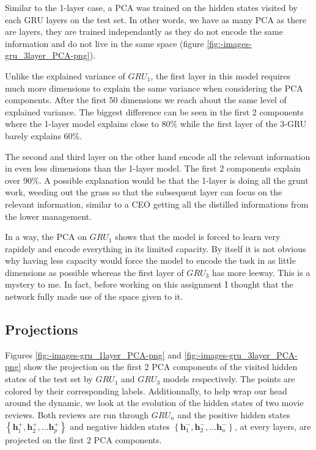 \documentclass{article}
\begin{document}
Similar to the 1-layer case, a PCA was trained on the hidden states visited by each GRU layers on the test set. In other words, we have as many PCA as there are layers, they are trained independantly as they do not encode the same information and do not live in the same space (figure \ref{fig:-images-gru_3layer_PCA-png}).

Unlike the explained variance of $GRU_1$, the first layer in this model requires much more dimensions to explain the same variance when considering the PCA components. After the first 50 dimensions we reach about the same level of explained variance. The biggest difference can be seen in the first 2 components where the 1-layer model explains close to 80\% while the first layer of the 3-GRU barely explains 60\%. 

The second and third layer on the other hand encode all the relevant information in even less dimensions than the 1-layer model. The first 2 components explain over 90\%. A possible explanation would be that the 1-layer is doing all the grunt work, weeding out the grass so that the subsequent layer can focus on the relevant information, similar to a CEO getting all the distilled informations from the lower management. 

In a way, the PCA on $GRU_1$ shows that the model is forced to learn very rapidely and encode everything in its limited capacity. By itself it is not obvious why having less capacity would force the model to encode the task in as little dimensions as possible whereas the first layer of $GRU_3$ has more leeway. This is a mystery to me. In fact, before working on this assignment I thought that the network fully made use of the space given to it.

\subsection{Projections}

Figures \ref{fig:-images-gru_1layer_PCA-png} and \ref{fig:-images-gru_3layer_PCA-png} show the projection on the first 2 PCA components of the visited hidden states of the test set by $GRU_1$ and $GRU_3$ models respectively. The points are colored by their corresponding labels. Additionnally, to help wrap our head around the dynamic, we look at the evolution of the hidden states of two movie reviews. Both reviews are run through $GRU_n$ and the positive hidden states $\left\{\mathbf{h}_1^+, \mathbf{h}_2^+, \ldots \mathbf{h}_p^+\right\}$ and negative hidden states $\left\{\mathbf{h}_1^-, \mathbf{h}_2^-, \ldots \mathbf{h}_n^-\right\}$, at every layers, are projected on the first 2 PCA components.
\end{document}

